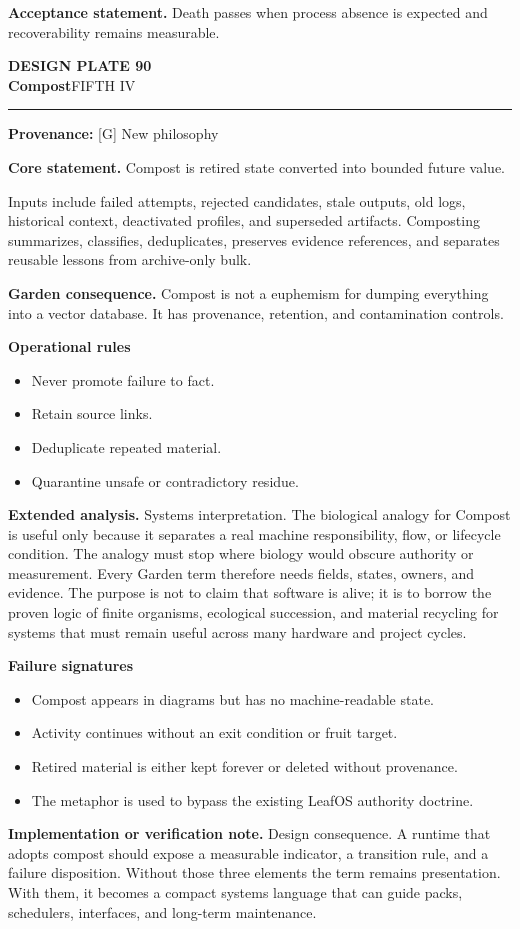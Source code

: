 \documentclass[10pt,letterpaper,oneside]{article}
\newcommand{\prov}[1]{\textcolor{gardenBlue}{\sffamily\footnotesize\textbf{Provenance:} #1}}
\newcommand{\platetitle}[3]{%
  \begin{minipage}[t][0.54in][t]{\textwidth}
  {\sffamily\bfseries\color{gardenDeep}\fontsize{9}{10}\selectfont DESIGN PLATE #1}\\[-1pt]
  {\sffamily\bfseries\color{gardenInk}\fontsize{16.5}{18}\selectfont #2}\hfill{\sffamily\color{gardenGreen}\large #3}
  \end{minipage}\vspace{-2pt}\hrule\vspace{5pt}}
\begin{document}
\begin{acceptbox}
\textbf{Acceptance statement.} Death passes when process absence is expected and recoverability remains measurable.
\end{acceptbox}
\newpage
\platetitle{90}{Compost}{FIFTH IV}
\prov{[G] New philosophy}
\fontsize{8.85}{10.45}\selectfont
\begin{corebox}
\textbf{Core statement.} Compost is retired state converted into bounded future value.
\end{corebox}
Inputs include failed attempts, rejected candidates, stale outputs, old logs, historical context, deactivated profiles, and superseded artifacts. Composting summarizes, classifies, deduplicates, preserves evidence references, and separates reusable lessons from archive-only bulk.

\textbf{Garden consequence.} Compost is not a euphemism for dumping everything into a vector database. It has provenance, retention, and contamination controls.

\textbf{Operational rules}
\begin{itemize}
\item Never promote failure to fact.
\item Retain source links.
\item Deduplicate repeated material.
\item Quarantine unsafe or contradictory residue.
\end{itemize}
\textbf{Extended analysis.} Systems interpretation. The biological analogy for Compost is useful only because it separates a real machine responsibility, flow, or lifecycle condition. The analogy must stop where biology would obscure authority or measurement. Every Garden term therefore needs fields, states, owners, and evidence. The purpose is not to claim that software is alive; it is to borrow the proven logic of finite organisms, ecological succession, and material recycling for systems that must remain useful across many hardware and project cycles.

\textbf{Failure signatures}
\begin{itemize}
\item Compost appears in diagrams but has no machine-readable state.
\item Activity continues without an exit condition or fruit target.
\item Retired material is either kept forever or deleted without provenance.
\item The metaphor is used to bypass the existing LeafOS authority doctrine.
\end{itemize}
\textbf{Implementation or verification note.} Design consequence. A runtime that adopts compost should expose a measurable indicator, a transition rule, and a failure disposition. Without those three elements the term remains presentation. With them, it becomes a compact systems language that can guide packs, schedulers, interfaces, and long-term maintenance.
\end{document}

